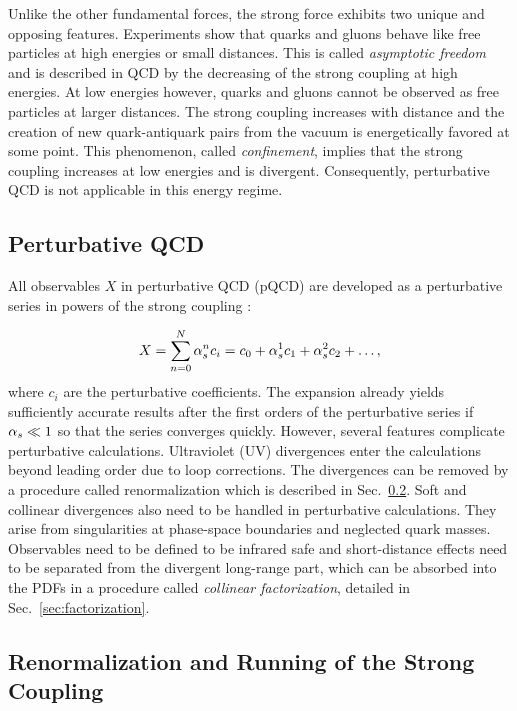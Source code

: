 Unlike the other fundamental forces, the strong force exhibits two unique and
opposing features. Experiments show that quarks and gluons behave like free
particles at high energies or small distances. This is called \emph{asymptotic
freedom} and is described in QCD by the decreasing of the strong coupling at
high energies. At low energies however, quarks and gluons cannot be observed as
free particles at larger distances. The strong coupling increases with distance
and the creation of new quark-antiquark pairs from the vacuum is energetically
favored at some point. This phenomenon, called \emph{confinement}, implies that
the strong coupling increases at low energies and is divergent. Consequently,
perturbative QCD is not applicable in this energy regime.

\subsection{Perturbative QCD}

All observables $X$ in perturbative QCD (pQCD) are developed as a
perturbative series in powers of the strong coupling \as:

\begin{equation*}
    X = \sum_{n=0}^N \alpha_{s}^n c_i = c_0 + \alpha_{s}^1 c_1 + \alpha_{s}^2 c_2 + \ldots, 
\end{equation*}
%
where $c_i$ are the perturbative coefficients. The expansion already yields
sufficiently accurate results after the first orders of the perturbative series
if $\alpha_{s} \ll 1$ so that the series converges quickly. However, several features
complicate perturbative calculations. Ultraviolet (UV) divergences enter the
calculations beyond leading order due to loop corrections. The divergences can
be removed by a procedure called renormalization which is described in
Sec.~\ref{sec:renormalization}. Soft and collinear divergences also need to be
handled in perturbative calculations. They arise from singularities at
phase-space boundaries and neglected quark masses. Observables need to be
defined to be infrared safe and short-distance effects need to be separated from
the divergent long-range part, which can be absorbed into the PDFs in a
procedure called \emph{collinear factorization}, detailed in
Sec.~\ref{sec:factorization}.

\subsection{Renormalization and Running of the Strong Coupling}
\label{sec:renormalization}

